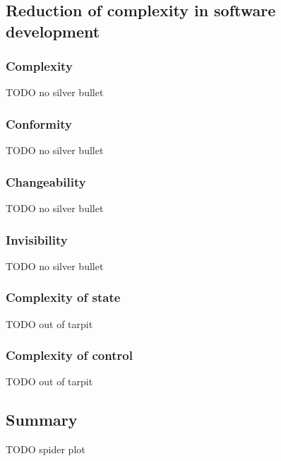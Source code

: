 \subsection{Reduction of complexity in software development}
\subsubsection{Complexity}
TODO no silver bullet
\subsubsection{Conformity}
TODO no silver bullet
\subsubsection{Changeability}
TODO no silver bullet
\subsubsection{Invisibility}
TODO no silver bullet
\subsubsection{Complexity of state}
TODO out of tarpit
\subsubsection{Complexity of control}
TODO out of tarpit

\subsection{Summary}
TODO spider plot

